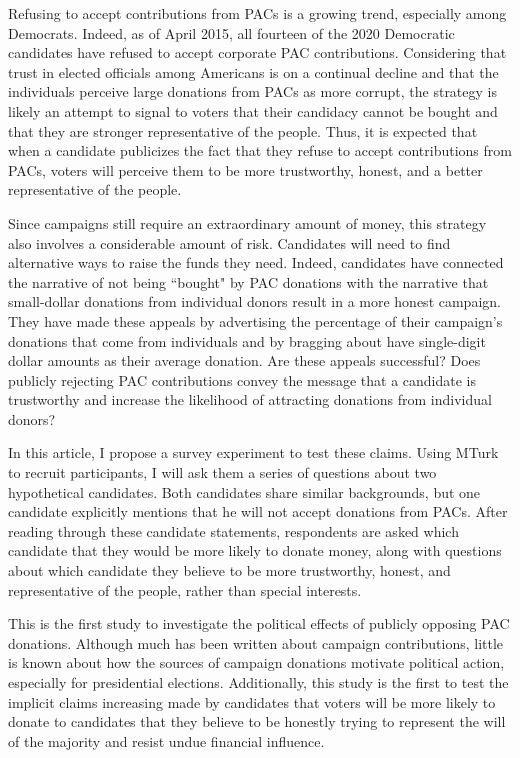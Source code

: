 \documentclass[12pt]{article}
\begin{document}
Refusing to accept contributions from PACs is a growing trend, especially among Democrats. Indeed, as of April 2015, all fourteen of the 2020 Democratic candidates have refused to accept corporate PAC contributions. Considering that trust in elected officials among Americans is on a continual decline and that the individuals perceive large donations from PACs as more corrupt, the strategy is likely an attempt to signal to voters that their candidacy cannot be bought and that they are stronger representative of the people. Thus, it is expected that when a candidate publicizes the fact that they refuse to accept contributions from PACs, voters will perceive them to be more trustworthy, honest, and a better representative of the people. 

Since campaigns still require an extraordinary amount of money, this strategy also involves a considerable amount of risk. Candidates will need to find alternative ways to raise the funds they need. Indeed, candidates have connected the narrative of not being ``bought" by PAC donations with the narrative that small-dollar donations from individual donors result in a more honest campaign. They have made these appeals by advertising the percentage of their campaign's donations that come from individuals and by bragging about have single-digit dollar amounts as their average donation. Are these appeals successful? Does publicly rejecting PAC contributions convey the message that a candidate is trustworthy and increase the likelihood of attracting donations from individual donors? 

In this article, I propose a survey experiment to test these claims. Using MTurk to recruit participants, I will ask them a series of questions about two hypothetical candidates. Both candidates share similar backgrounds, but one candidate explicitly mentions that he will not accept donations from PACs. After reading through these candidate statements, respondents are asked which candidate that they would be more likely to donate money, along with questions about which candidate they believe to be more trustworthy, honest, and representative of the people, rather than special interests. 

This is the first study to investigate the political effects of publicly opposing PAC donations. Although much has been written about campaign contributions, little is known about how the sources of campaign donations motivate political action, especially for presidential elections. Additionally, this study is the first to test the implicit claims increasing made by candidates that voters will be more likely to donate to candidates that they believe to be honestly trying to represent the will of the majority and resist undue financial influence. 
\end{document}

